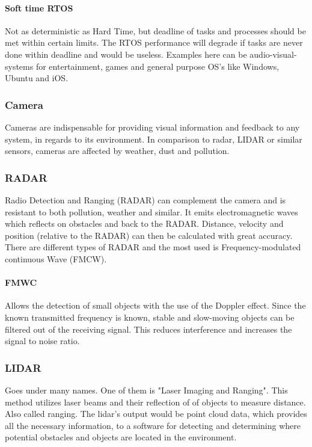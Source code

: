 \documentclass[conference]{IEEEtran}
\begin{document}
		 \paragraph{Soft time RTOS}
		 Not as deterministic as Hard Time, but deadline of tasks and processes should be met within
		 certain limits. The RTOS performance will degrade if tasks are never done within deadline and
		 would be useless. Examples here can be audio-visual-systems for entertainment, games and general purpose
		 OS's like Windows, Ubuntu and iOS.
	 \subsubsection{Camera}
		 Cameras are indispensable for providing visual information and feedback to any system,
		 in regards to its environment. In comparison to radar, LIDAR or similar sensors,
		 cameras are affected by weather, dust and pollution.
	 \subsubsection{RADAR}
		 Radio Detection and Ranging (RADAR) can complement the camera and is resistant to both
		 pollution, weather and similar. It emits electromagnetic waves which reflects on obstacles
		 and back to the RADAR. Distance, velocity and position (relative to the RADAR) can then
		 be calculated with great accuracy. There are different types of RADAR and the most used
		 is Frequency-modulated continuous Wave (FMCW).

		 \paragraph{FMWC}
		 Allows the detection of small objects with the use of the Doppler effect. Since the
		 known transmitted frequency is known, stable and slow-moving objects can be filtered
		 out of the receiving signal. This reduces interference and increases the signal to noise
		 ratio.
	 \subsubsection{LIDAR}
		 Goes under many names. One of them is "Laser Imaging and Ranging".
		 This method utilizes laser beams and their reflection of of objects to measure distance.
		 Also called ranging. The lidar's output would be point cloud data, which provides all the
		 necessary information, to a software for detecting and determining where potential
		 obstacles and objects are located in the environment.
\end{document}
